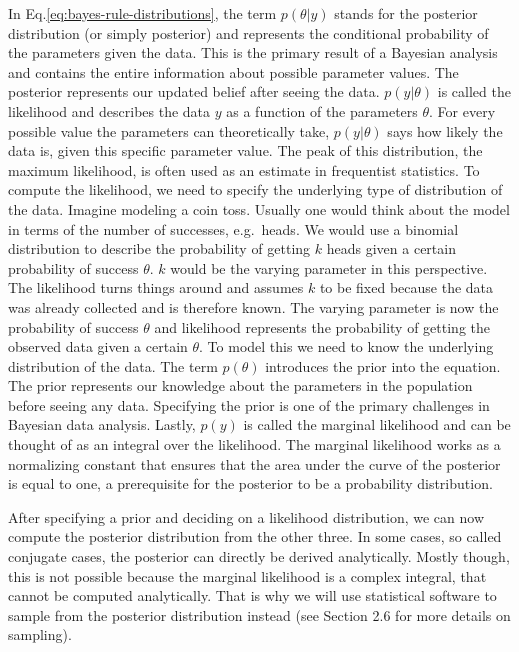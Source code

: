 \documentclass[
  doc,12pt,floatsintext]{apa7}
\begin{document}
In Eq.\eqref{eq:bayes-rule-distributions}, the term \(p(\theta|y)\) stands for the posterior distribution (or simply posterior) and represents the conditional probability of the parameters given the data. This is the primary result of a Bayesian analysis and contains the entire information about possible parameter values. The posterior represents our updated belief after seeing the data. \(p(y|\theta)\) is called the likelihood and describes the data \(y\) as a function of the parameters \(\theta\). For every possible value the parameters can theoretically take, \(p(y|\theta)\) says how likely the data is, given this specific parameter value. The peak of this distribution, the maximum likelihood, is often used as an estimate in frequentist statistics. To compute the likelihood, we need to specify the underlying type of distribution of the data. Imagine modeling a coin toss. Usually one would think about the model in terms of the number of successes, e.g.~heads. We would use a binomial distribution to describe the probability of getting \(k\) heads given a certain probability of success \(\theta\). \(k\) would be the varying parameter in this perspective. The likelihood turns things around and assumes \(k\) to be fixed because the data was already collected and is therefore known. The varying parameter is now the probability of success \(\theta\) and likelihood represents the probability of getting the observed data given a certain \(\theta\). To model this we need to know the underlying distribution of the data. The term \(p(\theta)\) introduces the prior into the equation. The prior represents our knowledge about the parameters in the population before seeing any data. Specifying the prior is one of the primary challenges in Bayesian data analysis. Lastly, \(p(y)\) is called the marginal likelihood and can be thought of as an integral over the likelihood. The marginal likelihood works as a normalizing constant that ensures that the area under the curve of the posterior is equal to one, a prerequisite for the posterior to be a probability distribution.

After specifying a prior and deciding on a likelihood distribution, we can now compute the posterior distribution from the other three. In some cases, so called conjugate cases, the posterior can directly be derived analytically. Mostly though, this is not possible because the marginal likelihood is a complex integral, that cannot be computed analytically. That is why we will use statistical software to sample from the posterior distribution instead (see Section 2.6 for more details on sampling).
\end{document}
